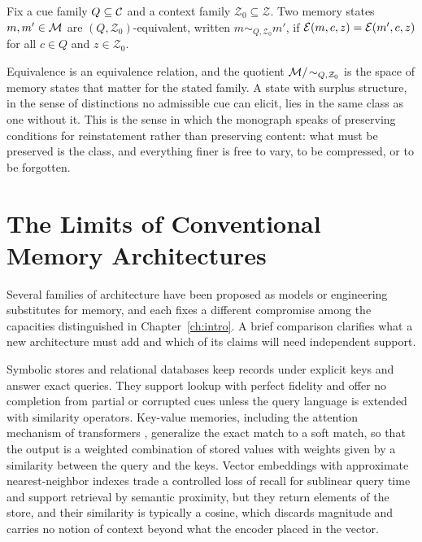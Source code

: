 \begin{definition}\label{def:equiv}
Fix a cue family $Q\subseteq\mathcal{C}$ and a context family $\mathcal Z_0\subseteq\mathcal Z$. Two memory states $m,m'\in\mathcal{M}$ are $(Q,\mathcal Z_0)$-equivalent, written $m\sim_{Q,\mathcal Z_0}m'$, if $\mathcal{E}(m,c,z)=\mathcal{E}(m',c,z)$ for all $c\in Q$ and $z\in\mathcal Z_0$.
\end{definition}

Equivalence is an equivalence relation, and the quotient $\mathcal{M}/\!\sim_{Q,\mathcal Z_0}$ is the space of memory states that matter for the stated family. A state with surplus structure, in the sense of distinctions no admissible cue can elicit, lies in the same class as one without it. This is the sense in which the monograph speaks of preserving conditions for reinstatement rather than preserving content: what must be preserved is the class, and everything finer is free to vary, to be compressed, or to be forgotten.

\chapter{The Limits of Conventional Memory Architectures}\label{ch:limits}

Several families of architecture have been proposed as models or engineering substitutes for memory, and each fixes a different compromise among the capacities distinguished in Chapter~\ref{ch:intro}. A brief comparison clarifies what a new architecture must add and which of its claims will need independent support.

Symbolic stores and relational databases keep records under explicit keys and answer exact queries. They support lookup with perfect fidelity and offer no completion from partial or corrupted cues unless the query language is extended with similarity operators. Key-value memories, including the attention mechanism of transformers \cite{vaswani2017}, generalize the exact match to a soft match, so that the output is a weighted combination of stored values with weights given by a similarity between the query and the keys. Vector embeddings with approximate nearest-neighbor indexes trade a controlled loss of recall for sublinear query time and support retrieval by semantic proximity, but they return elements of the store, and their similarity is typically a cosine, which discards magnitude and carries no notion of context beyond what the encoder placed in the vector.

